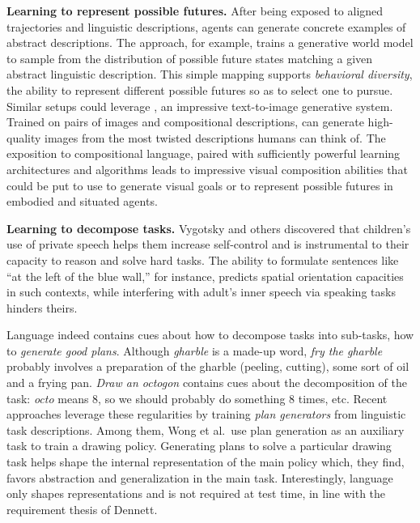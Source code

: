 \textbf{Learning to represent possible futures.} After being exposed to aligned trajectories and linguistic descriptions, agents can generate concrete examples of abstract descriptions. The \decstr approach, for example, trains a generative world model to sample from the distribution of possible future states matching a given abstract linguistic description.\cite{akakzia_grounding_2021} This simple mapping supports \textit{behavioral diversity}, the ability to represent different possible futures so as to select one to pursue. Similar setups could leverage \dalle, an impressive text-to-image generative system.\cite{ramesh_zero-shot_2021,ramesh2022hierarchical} Trained on pairs of images and compositional descriptions, \dalle can generate high-quality images from the most twisted descriptions humans can think of. The exposition to compositional language, paired with sufficiently powerful learning architectures and algorithms leads to impressive visual composition abilities that could be put to use to generate visual goals or to represent possible futures in embodied and situated agents. 

\textbf{Learning to decompose tasks.} Vygotsky and others discovered that children's use of private speech helps them increase self-control and is instrumental to their capacity to reason and solve hard tasks.\cite{vygotsky_thought_1934, berk_why_1994} The ability to formulate sentences like ``at the left of the blue wall,'' for instance, predicts spatial orientation capacities in such contexts, while interfering with adult's inner speech via speaking tasks hinders theirs.\cite{hermer-vazquez_language_2001}

Language indeed contains cues about how to decompose tasks into sub-tasks, \ie how to \textit{generate good plans}. Although \textit{gharble} is a made-up word, \textit{fry the gharble} probably involves a preparation of the gharble (\eg peeling, cutting), some sort of oil and a frying pan.\cite{yuan_interactive_2019} \textit{Draw an octogon} contains cues about the decomposition of the task: \textit{octo} means 8, so we should probably do something 8 times, etc.\cite{wong_leveraging_2021} Recent \ai approaches leverage these regularities by training \textit{plan generators} from linguistic task descriptions.\cite{jiang_language_2019, chen_ask_2021, sharma2021skill, mirchandani2021ella, shridhar_alfworld_2021, wong_leveraging_2021} Among them, Wong et al.\, use plan generation as an auxiliary task to train a drawing policy.\cite{wong_leveraging_2021} Generating plans to solve a particular drawing task helps shape the internal representation of the main policy which, they find, favors abstraction and generalization in the main task. Interestingly, language only shapes representations and is not required at test time, in line with the requirement thesis of Dennett.

